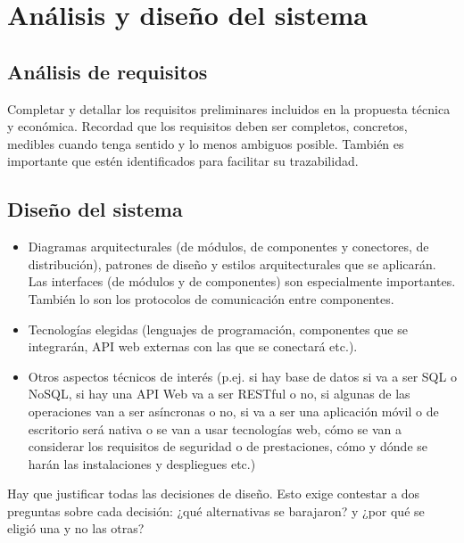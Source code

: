 \documentclass[12pt]{article}%
\begin{document}

\section{An\'alisis y dise\~no del sistema} %

\subsection{An\'alisis de requisitos}
Completar y detallar los requisitos preliminares incluidos en la propuesta t\'ecnica y econ\'omica. Recordad que los requisitos deben ser completos, concretos, medibles cuando tenga sentido y lo menos ambiguos posible. Tambi\'en es importante que est\'en identificados para facilitar su trazabilidad.

\subsection{Dise\~no del sistema}
\begin{itemize}
	\item Diagramas arquitecturales (de m\'odulos, de componentes y conectores, de distribuci\'on), patrones de dise\~no y estilos arquitecturales que se aplicar\'an. Las interfaces (de m\'odulos y de componentes) son especialmente importantes. Tambi\'en lo son los protocolos de comunicaci\'on entre componentes.
	\item Tecnolog\'ias elegidas (lenguajes de programaci\'on, componentes que se integrar\'an, API web externas con las que se conectar\'a etc.).
	\item Otros aspectos t\'ecnicos de inter\'es (p.ej. si hay base de datos si va a ser SQL o NoSQL, si hay una API Web va a ser RESTful o no, si algunas de las operaciones van a ser as\'incronas o no, si va a ser una aplicaci\'on m\'ovil o de escritorio ser\'a nativa o se van a usar tecnolog\'ias web, c\'omo se van a considerar los requisitos de seguridad o de prestaciones, c\'omo y d\'onde se har\'an las instalaciones y despliegues etc.)
\end{itemize}

Hay que justificar todas las decisiones de dise\~no. Esto exige contestar a dos preguntas sobre cada decisi\'on: ¿qu\'e alternativas se barajaron? y ¿por qu\'e se eligi\'o una y no las otras?


\end{document}
